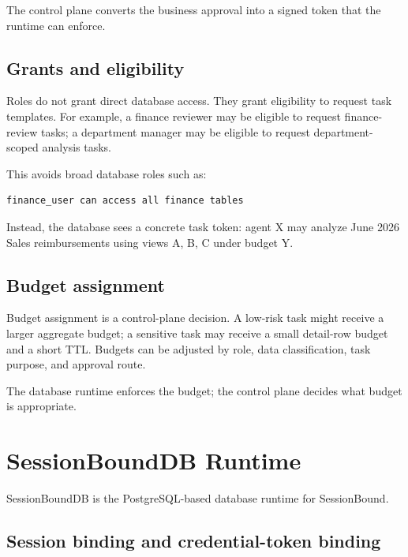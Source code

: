 \documentclass[journal]{IEEEtran}
\begin{document}
The control plane converts the business approval into a signed token
that the runtime can enforce.

\hypertarget{grants-and-eligibility}{%
\subsection{Grants and
eligibility}\label{grants-and-eligibility}}

Roles do not grant direct database access. They grant eligibility to
request task templates. For example, a finance reviewer may be eligible
to request finance-review tasks; a department manager may be eligible to
request department-scoped analysis tasks.

This avoids broad database roles such as:

\begin{verbatim}
finance_user can access all finance tables
\end{verbatim}

Instead, the database sees a concrete task token: agent X may analyze
June 2026 Sales reimbursements using views A, B, C under budget Y.

\hypertarget{budget-assignment}{%
\subsection{Budget assignment}\label{budget-assignment}}

Budget assignment is a control-plane decision. A low-risk task might
receive a larger aggregate budget; a sensitive task may receive a small
detail-row budget and a short TTL. Budgets can be adjusted by role, data
classification, task purpose, and approval route.

The database runtime enforces the budget; the control plane decides what
budget is appropriate.


\hypertarget{sessionbounddb-runtime}{%
\section{SessionBoundDB Runtime}\label{sessionbounddb-runtime}}

SessionBoundDB is the PostgreSQL-based database runtime for
SessionBound.

\hypertarget{session-binding-and-credential-token-binding}{%
\subsection{Session binding and credential-token
binding}\label{session-binding-and-credential-token-binding}}
\end{document}
